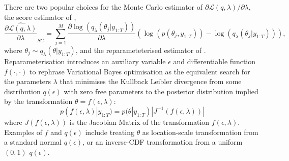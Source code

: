\documentclass[12pt,a4paper]{article}\usepackage[]{graphicx}\usepackage[]{color}
\begin{document}
There are two popular choices for the Monte Carlo estimator of $\partial\mathcal{L}(q, \lambda) / \partial \lambda$, the score estimator of \citet{Ranganath2014}, 
\begin{equation}
\label{scoreDeriv}
\widehat{\frac{\partial\mathcal{L}(q, \lambda)}{\partial \lambda}}_{SC} = \sum_{j = 1}^M \frac{\partial \log(q_{\lambda}(\theta_{j} | y_{1:T}))}{\partial \lambda} \left(\log(p(\theta_{j}, y_{1:T})) - \log(q_{\lambda}(\theta_{j} | y_{1:T})) \right),
\end{equation}
where $\theta_{j} \sim q_{\lambda}(\theta | y_{1:T})$, and the reparameteterised estimator of \citet{Kingma2014}. Reparameterisation introduces an auxiliary variable $\epsilon$ and differentiable function $f(\cdot, \cdot)$ to rephrase Variational Bayes optimisation as the equivalent search for the parameters $\lambda$ that minimises the Kullback Leibler divergence from some distribution $q(\epsilon)$ with zero free parameters to the posterior distribution implied by the transformation $\theta = f(\epsilon, \lambda)$:
\begin{equation}
\label{rpDist}
p(f(\epsilon, \lambda) | y_{1:T}) = p(\theta | y_{1:T}) |J^{-1}(f(\epsilon, \lambda))|
\end{equation}
where $J(f(\epsilon, \lambda))$ is the Jacobian Matrix of the transformation $f(\epsilon, \lambda)$. Examples of $f$ and $q(\epsilon)$ include treating $\theta$ as location-scale transformation from a standard normal $q(\epsilon)$, or an inverse-CDF transformation from a uniform$(0, 1)$ $q(\epsilon)$. 
\\
\end{document}
